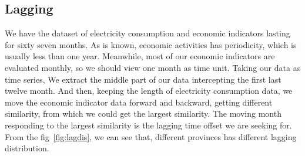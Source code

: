 
\subsection{Lagging}
We have the dataset of electricity consumption and economic indicators lasting for sixty seven months. As is known, economic activities has 
periodicity, which is usually less than one year. Meanwhile, most of our economic indicators are evaluated monthly, so we should view one month as time unit. Taking our data as time series, We extract the middle part of our data intercepting the first last twelve month. And then, keeping the length of electricity consumption data, we move the economic indicator data forward and backward, getting different similarity, from which we could get the largest similarity. The moving month responding to the largest similarity is the lagging time offset we are seeking for. From the fig~\ref{fig:lagdis}, we can see that, different provinces has different lagging distribution.
 
